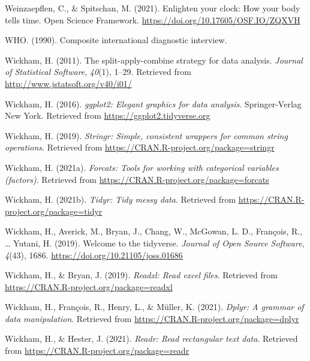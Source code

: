 \documentclass[
  english,
  man]{apa6}
\newlength{\cslhangindent}
\newlength{\cslentryspacingunit} %
\newenvironment{CSLReferences}[2] %
 {%
  \setlength{\parindent}{0pt}
  \ifodd #1
  \let\oldpar\par
  \def\par{\hangindent=\cslhangindent\oldpar}
  \fi
  \setlength{\parskip}{#2\cslentryspacingunit}
 }%
 {}
\begin{document}
\begin{CSLReferences}{1}{0}
\leavevmode{}%
Weinzaepflen, C., \& Spitschan, M. (2021). Enlighten your clock: How your body tells time. {Open Science Framework}. \url{https://doi.org/10.17605/OSF.IO/ZQXVH}

\leavevmode{}%
WHO. (1990). Composite international diagnostic interview.

\leavevmode{}%
Wickham, H. (2011). The split-apply-combine strategy for data analysis. \emph{Journal of Statistical Software}, \emph{40}(1), 1--29. Retrieved from \url{http://www.jstatsoft.org/v40/i01/}

\leavevmode{}%
Wickham, H. (2016). \emph{ggplot2: Elegant graphics for data analysis}. Springer-Verlag New York. Retrieved from \url{https://ggplot2.tidyverse.org}

\leavevmode{}%
Wickham, H. (2019). \emph{Stringr: Simple, consistent wrappers for common string operations}. Retrieved from \url{https://CRAN.R-project.org/package=stringr}

\leavevmode{}%
Wickham, H. (2021a). \emph{Forcats: Tools for working with categorical variables (factors)}. Retrieved from \url{https://CRAN.R-project.org/package=forcats}

\leavevmode{}%
Wickham, H. (2021b). \emph{Tidyr: Tidy messy data}. Retrieved from \url{https://CRAN.R-project.org/package=tidyr}

\leavevmode{}%
Wickham, H., Averick, M., Bryan, J., Chang, W., McGowan, L. D., François, R., \ldots{} Yutani, H. (2019). Welcome to the {tidyverse}. \emph{Journal of Open Source Software}, \emph{4}(43), 1686. \url{https://doi.org/10.21105/joss.01686}

\leavevmode{}%
Wickham, H., \& Bryan, J. (2019). \emph{Readxl: Read excel files}. Retrieved from \url{https://CRAN.R-project.org/package=readxl}

\leavevmode{}%
Wickham, H., François, R., Henry, L., \& Müller, K. (2021). \emph{Dplyr: A grammar of data manipulation}. Retrieved from \url{https://CRAN.R-project.org/package=dplyr}

\leavevmode{}%
Wickham, H., \& Hester, J. (2021). \emph{Readr: Read rectangular text data}. Retrieved from \url{https://CRAN.R-project.org/package=readr}


\end{CSLReferences}
\end{document}
